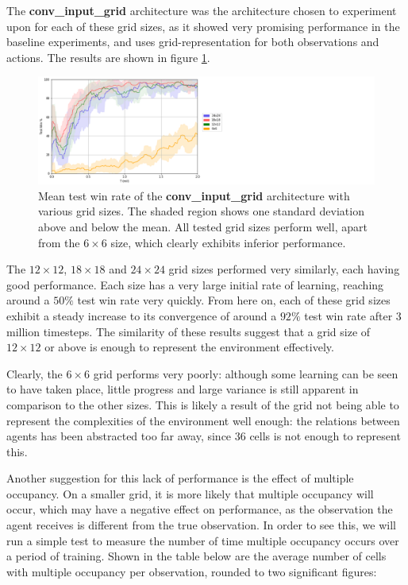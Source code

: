 The \textbf{conv\_input\_grid} architecture was the architecture chosen to experiment upon for each of these grid sizes, as it showed very promising performance in the baseline experiments, and uses grid-representation for both observations and actions. The results are shown in figure \ref{fig:gridsizes}.


\begin{figure}
    \centering
    \hbox{\hspace{5em}\includegraphics[scale=0.5]{images/graphs/grids.png}}
    \caption{Mean test win rate of the \textbf{conv\_input\_grid} architecture with various grid sizes. The shaded region shows one standard deviation above and below the mean. All tested grid sizes perform well, apart from the $6\times6$ size, which clearly exhibits inferior performance.}
    \label{fig:gridsizes}
\end{figure}

The $12\times12$, $18\times18$ and $24\times24$ grid sizes performed very similarly, each having good performance. Each size has a very large initial rate of learning, reaching around a $50\%$ test win rate very quickly. From here on, each of these grid sizes exhibit a steady increase to its convergence of around a $92\%$ test win rate after 3 million timesteps. The similarity of these results suggest that a grid size of $12 \times 12$ or above is enough to represent the environment effectively.




Clearly, the $6 \times 6$ grid performs very poorly: although some learning can be seen to have taken place, little progress and large variance is still apparent in comparison to the other sizes. This is likely a result of the grid not being able to represent the complexities of the environment well enough: the relations between agents has been abstracted too far away, since 36 cells is not enough to represent this. 

Another suggestion for this lack of performance is the effect of multiple occupancy. On a smaller grid, it is more likely that multiple occupancy will occur, which may have a negative effect on performance, as the observation the agent receives is different from the true observation. In order to see this, we will run a simple test to measure the number of time multiple occupancy occurs over a period of training. Shown in the table below are the average number of cells with multiple occupancy per observation, rounded to two significant figures:


